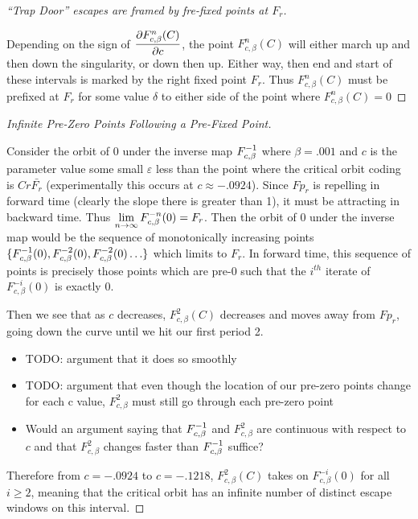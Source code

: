 \documentclass[12pt]{report}
\newenvironment{myproof}[1][\proofname]{%
  \begin{proof}[#1]$ $\par\nobreak\ignorespaces
}{%
  \end{proof}
}
\newcommand{\Fcb}{F_{c, \beta}}
\begin{document}
\begin{myproof}[``Trap Door'' escapes are framed by fre-fixed points at $F_r$]
	Depending on the sign of $\ds\frac{\partial \Fcb^n (C)}{\partial c}$, the point $\Fcb^n (C)$ will either march up and then down the singularity, or down then up. Either way, then end and start of these intervals is marked by the right fixed point $F_r$. Thus $\Fcb^n (C)$ must be prefixed at $F_r$ for some value $\delta$ to either side of the point where $\Fcb^n (C) = 0$
\end{myproof}

\begin{myproof}[Infinite Pre-Zero Points Following a Pre-Fixed Point]
Consider the orbit of 0 under the inverse map $F_{c, \beta}^{-1}$ where $\beta= .001$ and $c$ is the  parameter value some small $\varepsilon$ less than the point where the critical orbit coding is $Cr\bar{F_r}$ (experimentally this occurs at $c\approx -.0924$). Since $Fp_r$ is repelling in forward time (clearly the slope there is greater than 1), it must be attracting in backward time. Thus $\displaystyle\lim_{n \rightarrow \infty} F_{c,\beta}^{-n} (0) = F_r$. Then the orbit of $0$ under the inverse map would be the sequence of monotonically increasing points $\{\Fcb\inv (0), \Fcb^{-2} (0), \Fcb^{-2} (0) \ldots\}$ which limits to $F_r$. In forward time, this sequence of points is precisely those points which are pre-0 such that the $i^{th}$ iterate of $\Fcb^{-i} (0)$ is exactly 0.

Then we see that as $c$ decreases, $\Fcb^2 (C)$ decreases and moves away from $Fp_r$, going down the curve until we hit our first period 2.

\begin{itemize}
\item TODO: argument that it does so smoothly
\item TODO: argument that even though the location of our pre-zero points change for each c value, $\Fcb^2$ must still go through each pre-zero point
\item Would an argument saying that $\Fcb\inv$ and $\Fcb^2$ are continuous with respect to $c$ and that $\Fcb^2$ changes faster than $\Fcb\inv$ suffice?
\end{itemize}


Therefore from $c = -.0924$ to $c = -.1218$, $\Fcb^2 (C)$ takes on $\Fcb^{-i} (0)$ for all $i \geq 2$, meaning that the critical orbit has an infinite number of distinct escape windows on this interval.
\end{myproof}
\end{document}
